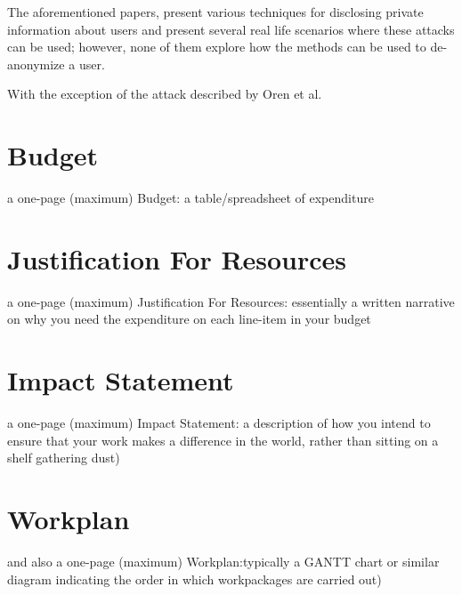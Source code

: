\documentclass[a4paper,11pt]{article}
\begin{document}
The aforementioned papers, present various techniques for disclosing private information about users and present several real life scenarios where these attacks can be used; however, none of them explore how the methods can be used to de-anonymize a user.

With the exception of the attack described by Oren et al.\cite{oren2015spy}









\newpage
\section*{Budget}

a one-page (maximum) Budget: a table/spreadsheet of expenditure

\newpage
\section*{Justification For Resources}

a one-page (maximum) Justification For Resources: essentially a written narrative on why you need the expenditure on each line-item in your budget

\newpage
\section*{Impact Statement}

a one-page (maximum) Impact Statement: a description of how you intend to ensure that your work makes a difference in the world, rather than sitting on a shelf gathering dust)

\newpage
\section*{Workplan}

and also a one-page (maximum) Workplan:typically a GANTT chart or similar diagram indicating the order in which workpackages are carried out)
\end{document}
